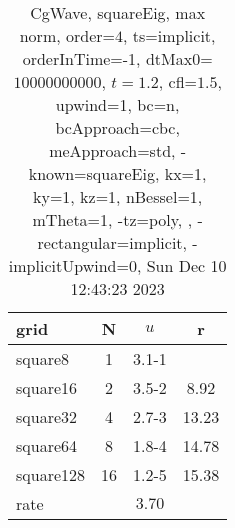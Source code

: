 \begin{table}[H]\tableFont %
\begin{center}
\begin{tabular}{|l|c|c|c|} \hline 
grid  & N &  $ u $ & r \\ \hline 
   square8 &     1 & \num{3.1}{-1} &        \\ \hline
  square16 &     2 & \num{3.5}{-2} &  8.92  \\ \hline
  square32 &     4 & \num{2.7}{-3} & 13.23  \\ \hline
  square64 &     8 & \num{1.8}{-4} & 14.78  \\ \hline
 square128 &    16 & \num{1.2}{-5} & 15.38  \\ \hline
    rate             &       &  $3.70$       &       \\ \hline
\end{tabular}
\caption{CgWave, squareEig, max norm, order=$4$, ts=implicit, orderInTime=-1, dtMax0=$10000000000$, $t=1.2$, cfl=$1.5$, upwind=1, bc=n, bcApproach=cbc, meApproach=std, -known=squareEig, kx=1, ky=1, kz=1, nBessel=1, mTheta=1, -tz=poly, , -rectangular=implicit, -implicitUpwind=0, Sun Dec 10 12:43:23 2023}\label{table:squareEigOrder4max}
\end{center}
\end{table}
